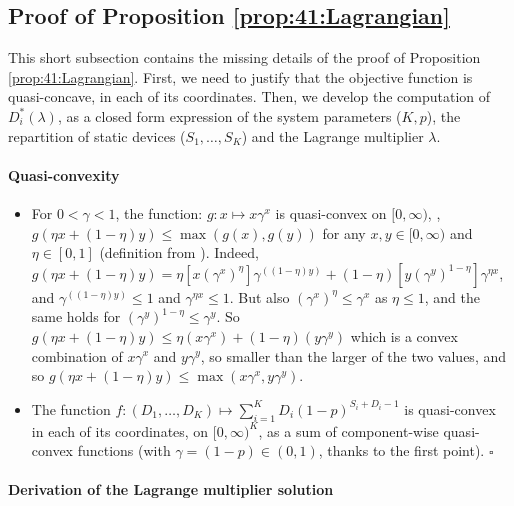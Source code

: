\subsection{Proof of Proposition \ref{prop:41:Lagrangian}}

This short subsection contains the missing details of the proof of Proposition \ref{prop:41:Lagrangian}.
%
First, we need to justify that the objective function is quasi-concave, in each of its coordinates.
%
Then, we develop the computation of $D_i^*(\lambda)$, as a closed form expression of the system parameters ($K, p$), the repartition of static devices ($S_1,\dots,S_{K}$) and the Lagrange multiplier $\lambda$.

\paragraph{Quasi-convexity}

\begin{itemize}
	\item
	For $0 < \gamma < 1$, the function: $g: x \mapsto x \gamma^x$ is quasi-convex on $[0,\infty)$, \ie, $g(\eta x + (1-\eta)y) \leq \max(g(x), g(y))$ for any $x,y \in [0,\infty)$ and $\eta \in [0,1]$ (definition from \cite{Luenberger68}).
    Indeed, $g(\eta x + (1-\eta)y) = \eta \left[ x (\gamma^x)^{\eta} \right] \gamma^{((1-\eta)y)} + (1-\eta)\left[ y (\gamma^y)^{1-\eta}\right] \gamma^{\eta x}$, and $\gamma^{((1-\eta)y)} \leq 1$ and $\gamma^{\eta x} \leq 1$. But also $(\gamma^x)^{\eta} \leq \gamma^x$ as $\eta \leq 1$, and the same holds for $(\gamma^y)^{1-\eta} \leq \gamma^y$. So $g(\eta x + (1-\eta)y) \leq \eta (x \gamma^x) + (1 - \eta) (y \gamma^y)$ which is a convex combination of $x \gamma^x$ and $y \gamma^y$, so smaller than the larger of the two values, and so $g(\eta x + (1-\eta)y) \leq \max(x \gamma^x, y \gamma^y)$.

    \item
    The function $f: (D_1, \dots, D_{K}) \mapsto \sum_{i=1}^{K} D_i (1 - p)^{S_i + D_i -1}$ is quasi-convex in each of its coordinates, on $[0,\infty)^{K}$, as a sum of component-wise quasi-convex functions (with $\gamma = (1 - p) \in (0, 1)$, thanks to the first point).
    \hfill{}$\square$
\end{itemize}


\paragraph{Derivation of the Lagrange multiplier solution}

